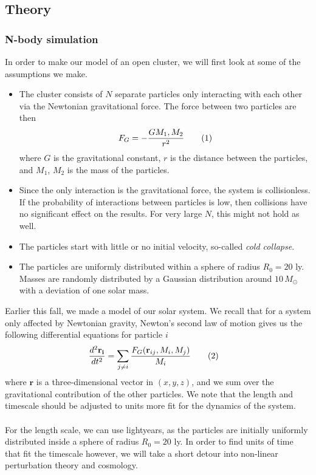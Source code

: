 \documentclass{article}
\newcommand\numberthis{\addtocounter{equation}{1}\tag{\theequation}}
\begin{document}
\subsection{Theory}

\subsubsection{N-body simulation}
In order to make our model of an open cluster, we will first look at some of the assumptions we make.
\begin{itemize}
  \item The cluster consists of $N$ separate particles only interacting with each other via the Newtonian gravitational force. The force between two particles are then
    \begin{align*}
      F_G = -\frac{G M_1, M_2}{r^2}\numberthis\label{eq:newton}
    \end{align*}
    where $G$ is the gravitational constant, $r$ is the distance between the particles, and $M_1$, $M_2$ is the mass of the particles.
  \item Since the only interaction is the gravitational force, the system is collisionless. If the probability of interactions between particles is low, then collisions have no significant effect on the results. For very large $N$, this might not hold as well.
  \item The particles start with little or no initial velocity, so-called \textit{cold collapse}.
  \item The particles are uniformly distributed within a sphere of radius $R_0 = 20$ ly. Masses are randomly distributed by a Gaussian distribution around $10\,M_{\odot}$ with a deviation of one solar mass.
\end{itemize}
Earlier this fall, we made a model of our solar system. \cite{Github3} We recall that for a system only affected by Newtonian gravity, Newton's second law of motion gives us the following differential equations for particle $i$
\begin{align*}
  \frac{d^2\mathbf{r_i}}{dt^2} &= \sum\limits_{j\neq i}\frac{F_G(\mathbf{r}_{ij}, M_i,M_j)}{M_i}\numberthis\label{eq:diff_eq}
\end{align*}
where $\mathbf{r}$ is a three-dimensional vector in $(x,y,z)$, and we sum over the gravitational contribution of the other particles. We note that the length and timescale should be adjusted to units more fit for the dynamics of the system.\\\\
For the length scale, we can use lightyears, as the particles are initially uniformly distributed inside a sphere of radius $R_0 = 20$ ly. In order to find units of time that fit the timescale however, we will take a short detour into non-linear perturbation theory and cosmology.
\end{document}
